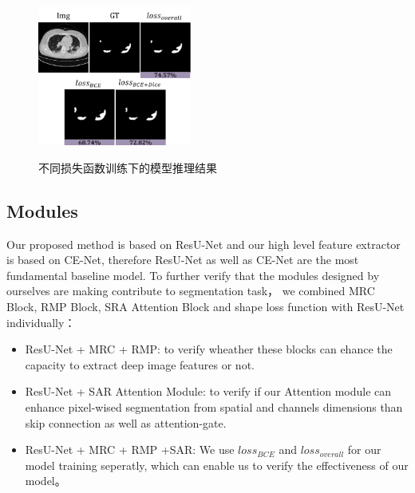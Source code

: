 \documentclass{ieeeaccess}
\begin{document}
  \begin{figure}[htbp]
    \begin{center}
    \includegraphics[width=0.45\textwidth]{figure/abliation_loss_img.pdf}
    \vspace{-2mm}
    \caption{不同损失函数训练下的模型推理结果} 
    \vspace{-2mm}
    \label{fig:ablation_loss}
    \end{center}
    \vspace{-0.35cm}
  \end{figure}




  \subsection{Modules}
  Our proposed method is based on ResU-Net and our high level feature extractor is based on CE-Net, therefore ResU-Net as well as CE-Net are the most fundamental baseline model.
  To further verify that the modules designed by ourselves are making contribute to segmentation task，
  we combined MRC Block, RMP Block, SRA Attention Block and shape loss function with ResU-Net individually：
  \begin{itemize}
      \item ResU-Net + MRC + RMP: to verify wheather these blocks can ehance the capacity to extract deep image features or not.
      \item ResU-Net + SAR Attention Module: to verify if our Attention module can enhance pixel-wised segmentation from spatial and channels dimensions than skip connection as well as
            attention-gate.
      \item ResU-Net + MRC + RMP +SAR: We use \(loss_{BCE}\) and \(loss_{overall}\) for our model training seperatly, which can enable us to verify the effectiveness of our model。
  \end{itemize}
\end{document}
